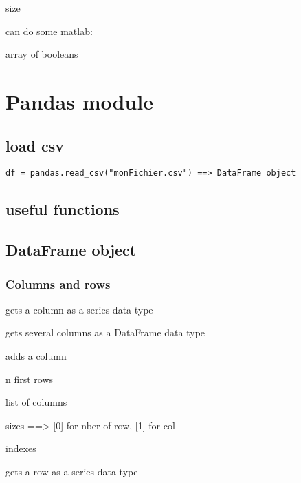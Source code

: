 
		 size

		can do some matlab:


		 array of booleans




\section{Pandas module}

	\subsection{load csv}

\begin{lstlisting}
df = pandas.read_csv("monFichier.csv") ==> DataFrame object
\end{lstlisting}

	\subsection{useful functions}
		

	\subsection{DataFrame object}

		\subsubsection{Columns and rows}
			
			 gets a column as a series data type

			 gets several columns as a DataFrame data type 

			 adds a column

			 n first rows

			 list of columns

			 sizes  ==> [0] for nber of row, [1] for col

			 indexes

			 gets a row as a series data type

